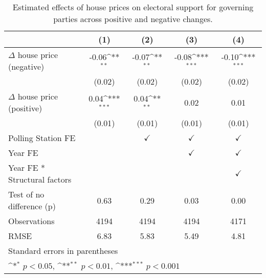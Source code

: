 \begin{table}[htbp]\centering
\def\sym#1{\ifmmode^{#1}\else\(^{#1}\)\fi}
\caption{Estimated effects of house prices on electoral support for governing parties across positive and negative changes.}
\begin{tabular}{l*{4}{c}}
\hline\hline
                    &\multicolumn{1}{c}{(1)}         &\multicolumn{1}{c}{(2)}         &\multicolumn{1}{c}{(3)}         &\multicolumn{1}{c}{(4)}         \\
\hline
$\Delta$ house price (negative)&       -0.06\sym{**} &       -0.07\sym{**} &       -0.08\sym{***}&       -0.10\sym{***}\\
                    &      (0.02)         &      (0.02)         &      (0.02)         &      (0.02)         \\
[1em]
$\Delta$ house price (positive)&        0.04\sym{***}&        0.04\sym{**} &        0.02         &        0.01         \\
                    &      (0.01)         &      (0.01)         &      (0.01)         &      (0.01)         \\
[1em]
\hline Polling Station FE&                     &$\checkmark$         &$\checkmark$         &$\checkmark$         \\
[1em]
Year FE             &                     &                     &$\checkmark$         &$\checkmark$         \\
[1em]
Year FE * Structural factors&                     &                     &                     &$\checkmark$         \\
\hline
Test of no difference (p)&        0.63         &        0.29         &        0.03         &        0.00         \\
Observations        &        4194         &        4194         &        4194         &        4171         \\
RMSE                &        6.83         &        5.83         &        5.49         &        4.81         \\
\hline\hline
\multicolumn{5}{l}{\footnotesize Standard errors in parentheses}\\
\multicolumn{5}{l}{\footnotesize \sym{*} \(p<0.05\), \sym{**} \(p<0.01\), \sym{***} \(p<0.001\)}\\
\end{tabular}
\end{table}

